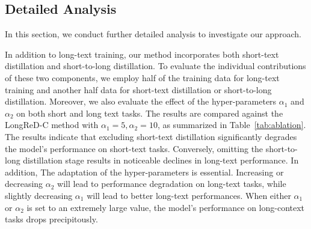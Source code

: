 \subsection{Detailed Analysis}
\label{sec:ablation}
In this section, we conduct further detailed analysis to investigate our approach.



In addition to long-text training, our method incorporates both short-text distillation and short-to-long distillation. To evaluate the individual contributions of these two components, we employ half of the training data for long-text training and another half data for short-text distillation or short-to-long distillation.
Moreover, we also evaluate the effect of the hyper-parameters $\alpha_1$ and 
$\alpha_2$ on both short and long text tasks. The results are compared against the LongReD-C method with $\alpha_1=5, \alpha_2 = 10$, as summarized in Table~\ref{tab:ablation}. The results indicate that excluding short-text distillation significantly degrades the model's performance on short-text tasks. Conversely, omitting the short-to-long distillation stage results in noticeable declines in long-text performance. In addition, The adaptation of the hyper-parameters is essential. Increasing or decreasing $\alpha_2$ will lead to performance degradation on long-text tasks, while slightly decreasing $\alpha_1$ will lead to better long-text performances. When either $\alpha_1$ or $\alpha_2$ is set to an extremely large value, the model's performance on long-context tasks drops precipitously. 




